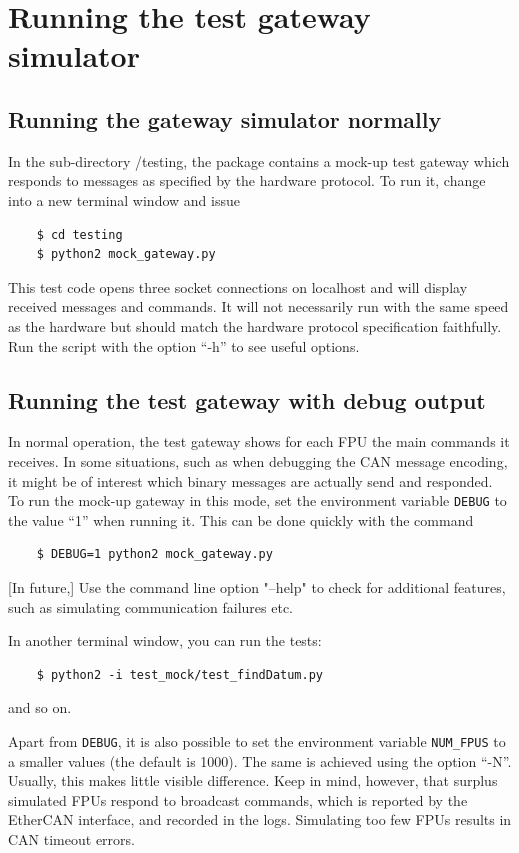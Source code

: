 \documentclass[11pt,a4paper]{scrartcl}
\begin{document}
\section{Running the test gateway simulator}
\label{sec:runningthegateway}
\subsection{Running the gateway simulator normally}
In the sub-directory /testing, the package contains a mock-up test
gateway which responds to messages as specified by the hardware
protocol. To run it, change into a new terminal window and
issue

  \begin{verbatim}
    $ cd testing
    $ python2 mock_gateway.py
  \end{verbatim}    


This test code opens three socket connections on localhost and will
display received messages and commands. It will not necessarily run
with the same speed as the hardware but should match the hardware
protocol specification faithfully. Run the script with the option
``-h'' to see useful options.

\subsection{Running the test gateway with debug output}

In normal operation, the test gateway shows for each FPU the main
commands it receives. In some situations, such as when debugging the
CAN message encoding, it might be of interest which binary messages
are actually send and responded. To run the mock-up gateway in this
mode, set the environment variable \texttt{DEBUG} to the value ``1''
when running it. This can be done quickly with the command

  \begin{verbatim}
    $ DEBUG=1 python2 mock_gateway.py
  \end{verbatim}    



[In future,] Use the command line option "--help" to check for additional features,
such as simulating communication failures etc.

In another terminal window, you can run the tests:
  \begin{verbatim}
    $ python2 -i test_mock/test_findDatum.py
  \end{verbatim}    
and so on.

Apart from \texttt{DEBUG}, it is also possible to set the environment
variable \texttt{NUM\_FPUS} to a smaller values (the default is 1000).
The same is achieved using the option ``-N''.  Usually, this makes
little visible difference. Keep in mind, however, that surplus
simulated FPUs respond to broadcast commands, which is reported by the
EtherCAN interface, and recorded in the logs. Simulating too few FPUs results in
CAN timeout errors.

\printindex
\end{document}
